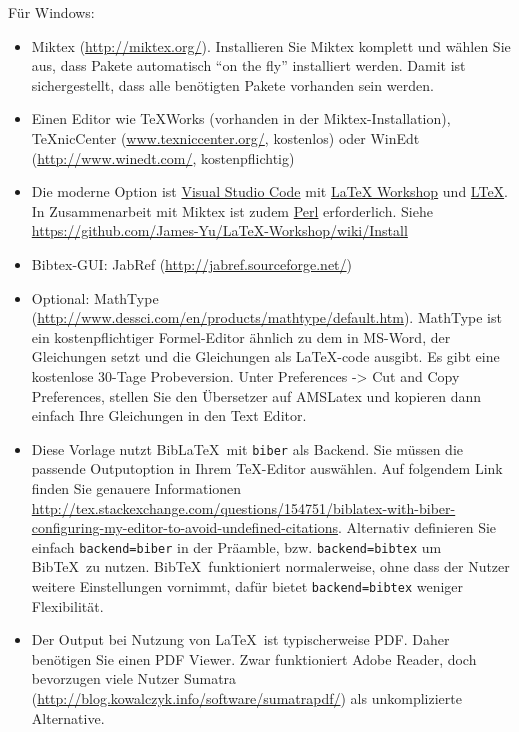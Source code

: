 \documentclass[a4paper,12pt]{scrartcl} %
\begin{document}
Für Windows:
\begin{itemize} %
	\item Miktex (\url{http://miktex.org/}). Installieren Sie Miktex komplett und wählen Sie aus, dass Pakete automatisch ``on the fly'' installiert werden. Damit ist sichergestellt, dass alle benötigten Pakete vorhanden sein werden.
	\item Einen Editor wie TeXWorks (vorhanden in der Miktex-Installation), TeXnicCenter (\url{www.texniccenter.org/}, kostenlos) oder WinEdt (\url{http://www.winedt.com/}, kostenpflichtig)
	\item Die moderne Option ist \href{https://code.visualstudio.com/}{Visual Studio Code} mit \href{https://marketplace.visualstudio.com/items?itemName=James-Yu.latex-workshop}{LaTeX Workshop} und \href{https://marketplace.visualstudio.com/items?itemName=valentjn.vscode-ltex}{LTeX}. In Zusammenarbeit mit Miktex ist zudem \href{https://strawberryperl.com/}{Perl} erforderlich. Siehe \url{https://github.com/James-Yu/LaTeX-Workshop/wiki/Install}
	\item Bibtex-GUI: JabRef (\url{http://jabref.sourceforge.net/})
	\item Optional: MathType (\url{http://www.dessci.com/en/products/mathtype/default.htm}). MathType ist ein kostenpflichtiger Formel-Editor ähnlich zu dem in MS-Word, der Gleichungen setzt und die Gleichungen als \LaTeX-code ausgibt. Es gibt eine kostenlose 30-Tage Probeversion. Unter Preferences -> Cut and Copy Preferences, stellen Sie den Übersetzer auf AMSLatex und kopieren dann einfach Ihre Gleichungen in den Text Editor.
	 \item Diese Vorlage nutzt Bib\LaTeX\ mit \texttt{biber} als Backend. Sie müssen die passende Outputoption in Ihrem \TeX-Editor auswählen. Auf folgendem Link finden Sie genauere Informationen \url{http://tex.stackexchange.com/questions/154751/biblatex-with-biber-configuring-my-editor-to-avoid-undefined-citations}. Alternativ definieren Sie einfach \texttt{backend=biber} in der Präamble, bzw. \texttt{backend=bibtex} um Bib\TeX\ zu nutzen. Bib\TeX\ funktioniert normalerweise, ohne dass der Nutzer weitere Einstellungen vornimmt, dafür bietet \texttt{backend=bibtex} weniger Flexibilität.
	\item Der Output bei Nutzung von \LaTeX\ ist typischerweise PDF. Daher benötigen Sie einen PDF Viewer. Zwar funktioniert Adobe Reader, doch bevorzugen viele Nutzer Sumatra (\url{http://blog.kowalczyk.info/software/sumatrapdf/}) als unkomplizierte Alternative.
\end{itemize}
\end{document}
